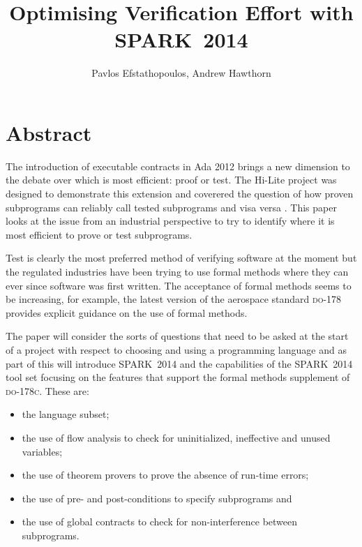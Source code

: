 \documentclass{llncs}
\newcommand{\DO}{\textsc{do-178}\xspace}
\newcommand{\DOC}{\textsc{do-178c}\xspace}
\newcommand{\newspark}{SPARK~2014\xspace}
\begin{document}
\title{Optimising Verification Effort with \newspark}

\author{Pavlos Efstathopoulos, Andrew Hawthorn}

\maketitle

\begin{abstract}
\end{abstract}

\section{Abstract}
The introduction of executable contracts in Ada 2012 brings a new
dimension to the debate over which is most efficient: proof or
test. The Hi-Lite project was designed to demonstrate this extension
and coverered the question of how proven subprograms can reliably call
tested subprograms and visa versa \cite{hiliteERTS2012}. This paper
looks at the issue from an industrial perspective to try to identify
where it is most efficient to prove or test subprograms.

Test is clearly the most preferred method of verifying software at the
moment but the regulated industries have been trying to use formal
methods where they can ever since software was first written. The
acceptance of formal methods seems to be increasing, for example, the
latest version of the aerospace standard \DO provides explicit
guidance on the use of formal methods.

The paper will consider the sorts of questions that need to be
asked at the start of a project with respect to choosing and using a
programming language and as part of this will introduce \newspark and the
capabilities of the \newspark tool set focusing on the features that
support the formal methods supplement of \DOC. These are:
\begin{itemize}
   \item the language subset;
   \item the use of flow analysis to check for uninitialized, ineffective
         and unused variables;
   \item the use of theorem provers to prove the absence of run-time errors;
   \item the use of pre- and post-conditions to specify subprograms and
   \item the use of global contracts to check for non-interference between 
         subprograms.
\end{itemize}
\end{document}
